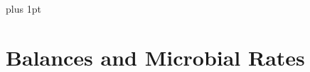 \documentclass[]{beamer}
\begin{document}
\parskip=1cm plus 1pt
\section{Balances and Microbial Rates}

\begin{comment}
\subsection{Microorganisms and Their Function in Nature}
\setcounter{questions}{0}
\begin{frame}[shrink] {}
\addtocounter{questions}{1}
\color{blue}
Where will you not find microorganisms? (\color{red}{Q\arabic{questions} Answers})\\
\color{black}
\setlength{\parindent}{-0.4cm}
{\color{red}$\circ$} On the ocean floor \\
{\color{red}$\circ$} On acid waters  \\
{\color{red}$\circ$} In ice  \\
{\color{red}$\bullet$} None of the above, microorganisms can be found in all these places. \\
\end{frame}

\begin{frame}[shrink] {}
\addtocounter{questions}{1}
\color{blue}
Why are microorganisms so important in the global cycling of elements? (\color{red}{Q\arabic{questions} Answers})\\
\color{black}
\setlength{\parindent}{-0.4cm}
{\color{red}$\bullet$} They break down organic material into e.g. $CO_2$ and $H_2O$, which can
then be converted into organic material again by photosynthesis;\\
{\color{red}$\circ$} When they die, they disintegrate into their constituting elements,
which fuel the element cycles;\\
{\color{red}$\circ$} The massive amounts of microorganisms present on earth
consume excess heat produced by the earth and sun in the process of
then elemental cycling. Without organisms the earth would therefore heat up.
\end{frame}

\begin{frame}[shrink] {}
\addtocounter{questions}{1}
\color{blue}
If you have one bacterial cell, dividing every hour, how many bacterial
cells would there be after 24 hours? (\color{red}{Q\arabic{questions} Answers})\\
\color{black}
\setlength{\parindent}{-0.4cm}
{\color{red}$\bullet$} 16,777,216
\end{frame}


\end{comment}
\end{document}
